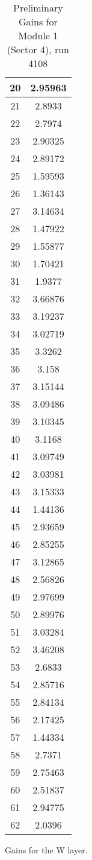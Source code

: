 \begin{table}[h]
\begin{subtable}[h]{2in}
{\begin{tabular}{|c|c|}
20	&	2.95963	\\	\hline
21	&	2.8933	\\	\hline
22	&	2.7974	\\	\hline
23	&	2.90325	\\	\hline
24	&	2.89172	\\	\hline
25	&	1.59593	\\	\hline
26	&	1.36143	\\	\hline
27	&	3.14634	\\	\hline
28	&	1.47922	\\	\hline
29	&	1.55877	\\	\hline
30	&	1.70421	\\	\hline
31	&	1.9377	\\	\hline
32	&	3.66876	\\	\hline
33	&	3.19237	\\	\hline
34	&	3.02719	\\	\hline
35	&	3.3262	\\	\hline
36	&	3.158	\\	\hline
37	&	3.15144	\\	\hline
38	&	3.09486	\\	\hline
39	&	3.10345	\\	\hline
40	&	3.1168	\\	\hline
41	&	3.09749	\\	\hline
42	&	3.03981	\\	\hline
43	&	3.15333	\\	\hline
44	&	1.44136	\\	\hline
45	&	2.93659	\\	\hline
46	&	2.85255	\\	\hline
47	&	3.12865	\\	\hline
48	&	2.56826	\\	\hline
49	&	2.97699	\\	\hline
50	&	2.89976	\\	\hline
51	&	3.03284	\\	\hline
52	&	3.46208	\\	\hline
53	&	2.6833	\\	\hline
54	&	2.85716	\\	\hline
55	&	2.84134	\\	\hline
56	&	2.17425	\\	\hline
57	&	1.44334	\\	\hline
58	&	2.7371	\\	\hline
59	&	2.75463	\\	\hline
60	&	2.51837	\\	\hline
61	&	2.94775	\\	\hline
62	&	2.0396	\\	\hline
        \end{tabular}
        }
        \caption{Gains for the W layer.}
    \end{subtable}
    \caption{Preliminary Gains for Module 1 (Sector 4), run 4108}
\end{table}


